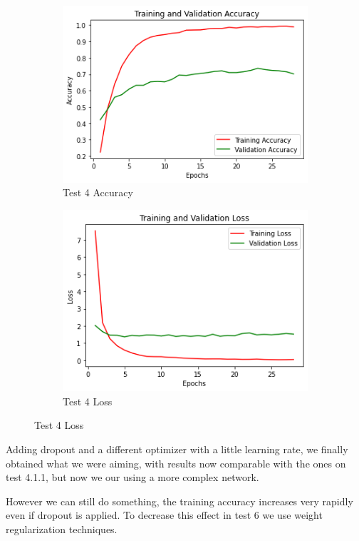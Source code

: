 \begin{figure}[H]
	\begin{subfigure}{0.5\textwidth}
		\includegraphics[width=0.9\linewidth]{img/vgg16/vgg16ft1dropacc.png} 
		\caption{Test 4 Accuracy}
		\label{fig:vgg16ft1dropacc}
	\end{subfigure}
	\begin{subfigure}{0.5\textwidth}
		\includegraphics[width=0.9\linewidth]{img/vgg16/vgg16ft1droploss.png}
		\caption{Test 4 Loss}
		\label{fig:vgg16ft1droploss}
	\end{subfigure}
\end{figure}


\noindent Adding dropout and a different optimizer with a little learning rate, we finally obtained what we were aiming, with results now comparable with the ones on test 4.1.1, but now we our using a more complex network.

However we can still do something, the training accuracy increases very rapidly even if dropout is applied. To decrease this effect in test 6 we use weight regularization techniques.



